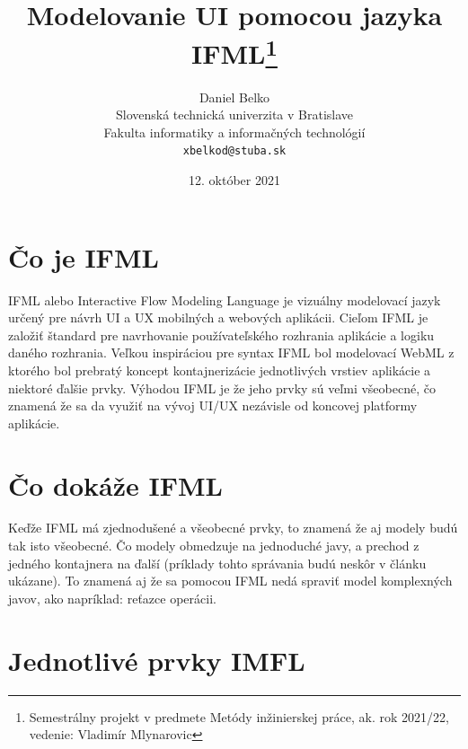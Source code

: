 \documentclass[12pt,twoside,slovak,a4paper]{article}
\title{Modelovanie UI pomocou jazyka IFML\thanks{Semestrálny projekt v predmete Metódy inžinierskej práce, ak. rok 2021/22, vedenie: Vladimír Mlynarovic}}
\author{Daniel Belko\\[2pt]
	{\small Slovenská technická univerzita v Bratislave}\\
	{\small Fakulta informatiky a informačných technológií}\\
	{\small \texttt{xbelkod@stuba.sk}}
	}
\date{\small 12. október 2021}
\begin{document}
\maketitle

\begin{abstract}

\end{abstract}



\section{Čo je IFML}

IFML alebo Interactive Flow Modeling Language je vizuálny modelovací jazyk určený pre návrh UI a UX mobilných a webových aplikácii. Cieľom IFML je založiť štandard pre navrhovanie používateľského rozhrania aplikácie a logiku daného rozhrania. Veľkou inspiráciou pre syntax IFML bol modelovací WebML z ktorého bol prebratý koncept kontajnerizácie jednotlivých vrstiev aplikácie a niektoré ďalšie prvky. Výhodou IFML je že jeho prvky sú veľmi všeobecné, čo znamená že sa da využiť na vývoj UI/UX nezávisle od koncovej platformy aplikácie.\cite{BF:IFML}

\section{Čo dokáže IFML}

Keďže IFML má zjednodušené a všeobecné prvky, to znamená že aj modely budú tak isto všeobecné. Čo modely obmedzuje na jednoduché javy, a prechod z jedného kontajnera na ďalší (príklady tohto správania budú neskôr v článku ukázane). To znamená aj že sa pomocou IFML nedá spraviť model komplexných javov, ako napríklad: reťazce operácii.

\clearpage

\section{Jednotlivé prvky IMFL}
\end{document}
